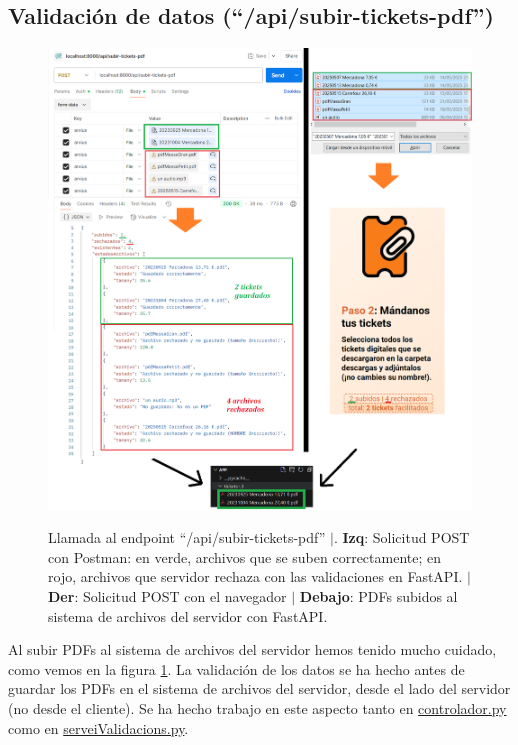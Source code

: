 \documentclass[a4paper,12pt]{report}
\begin{document}
	\subsection{Validación de datos (``/api/subir-tickets-pdf'')}
	\label{sec:validacioDadesApiSubirtickets}

	
	\FloatBarrier
	\setlength{\belowcaptionskip}{3pt}
	\begin{figure}[H]
		\centering
		\caption{Llamada al endpoint ``/api/subir-tickets-pdf'' $|$.\textbf{ Izq}: Solicitud POST con Postman: en verde, archivos que se suben correctamente; en rojo, archivos que servidor rechaza con las validaciones en FastAPI. $|$ \textbf{Der}: Solicitud POST con el navegador $|$ \textbf{Debajo}: PDFs subidos al sistema de archivos del servidor con FastAPI.}
		\includegraphics[width=1\linewidth]{img/validacionsArxiusPujadaEndpointTickets} 
		\label{fig:validacionsArxiusPujadaEndpointTickets}
	\end{figure}
	\FloatBarrier
	
	
	Al subir PDFs al sistema de archivos del servidor hemos tenido mucho cuidado, como vemos en la figura \ref{fig:validacionsArxiusPujadaEndpointTickets}.
	La validación de los datos se ha hecho antes de guardar los PDFs en el sistema de archivos del servidor, desde el lado del servidor (no desde el cliente). Se ha hecho trabajo en este aspecto tanto en \href{https://github.com/blackcub3s/mercApp/blob/main/APP%20WEB/__FastAPI__/app/controlador.py}{controlador.py} como en \href{https://github.com/blackcub3s/mercApp/blob/main/APP%20WEB/__FastAPI__/app/serveiValidacions.py}{serveiValidacions.py}. 
	
\end{document}
